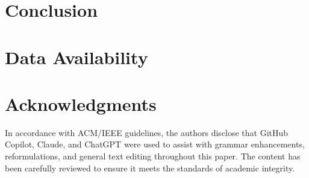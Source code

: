 \documentclass[sigconf,review]{acmart}
\newcommand{\missing}[1]{\todo[inline,color=yellow,caption={}]{\textbf{Missing}: #1}}
\newcommand{\githubRepo}{Will be available upon publication. Contained in the supplementary material for reviewers.}
\newcommand{\supplementaryMaterial}{Removed for blind review - Contained in the replication package for reviewers}
\begin{document}
\section{Conclusion}


\section*{Data Availability}




\section*{Acknowledgments}


In accordance with ACM/IEEE guidelines, the authors disclose that GitHub Copilot, Claude, and ChatGPT were used to assist with grammar enhancements, reformulations, and general text editing throughout this paper.
The content has been carefully reviewed to ensure it meets the standards of academic integrity.



\end{document}
